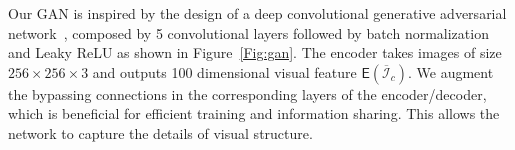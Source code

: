 \documentclass[10pt,twocolumn,letterpaper]{article}
\begin{document}






Our GAN is inspired by the design of a deep convolutional generative adversarial network~\cite{radford:2015,pathakCVPR16context}, composed by 5 convolutional layers followed by batch normalization and Leaky ReLU as shown in Figure~\ref{Fig:gan}. The encoder takes images of size $256 \times 256 \times 3$ and outputs 100 dimensional visual feature $\mathsf{E}(\overline{\mathcal{I}}_c)$. We augment the bypassing connections in the corresponding layers of the encoder/decoder, which is beneficial for efficient training and information sharing. This allows the network to capture the details of visual structure.
\end{document}
